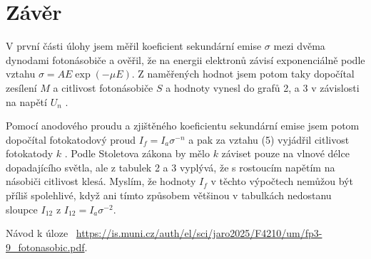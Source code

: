\documentclass[a4paper,11pt]{article}
\begin{document}
\section{Závěr}

V první části úlohy jsem měřil koeficient sekundární emise $ \sigma $ mezi dvěma dynodami fotonásobiče a ověřil, že na energii elektronů závisí exponenciálně podle vztahu $ \sigma = A E \exp (-\mu E) $. 
Z naměřených hodnot jsem potom taky dopočítal zesílení $ M $ a citlivost fotonásobiče $ S $ a hodnoty vynesl do grafů 2, a 3 v závislosti na napětí $ U_n $ .

Pomocí anodového proudu a zjištěného koeficientu sekundární emise jsem potom dopočítal fotokatodový proud $ I_f = I_a \sigma^{-n} $ a pak za vztahu (5) vyjádřil citlivost fotokatody $ k $ . Podle Stoletova zákona by mělo $ k $ záviset pouze na vlnové délce dopadajícího světla, ale z tabulek 2 a 3 vyplývá, že s rostoucím napětím na násobiči citlivost klesá. Myslím, že hodnoty $ I_f $ v těchto výpočtech nemůžou být příliš spolehlivé, když ani tímto způsobem většinou v tabulkách nedostanu sloupce $ I_{12} $ z $ I_{12} = I_a \sigma^{-2} $.










\begin{thebibliography}{0}
 Návod k úloze ~\url{https://is.muni.cz/auth/el/sci/jaro2025/F4210/um/fp3-9_fotonasobic.pdf}.   
\end{thebibliography}
\end{document}
